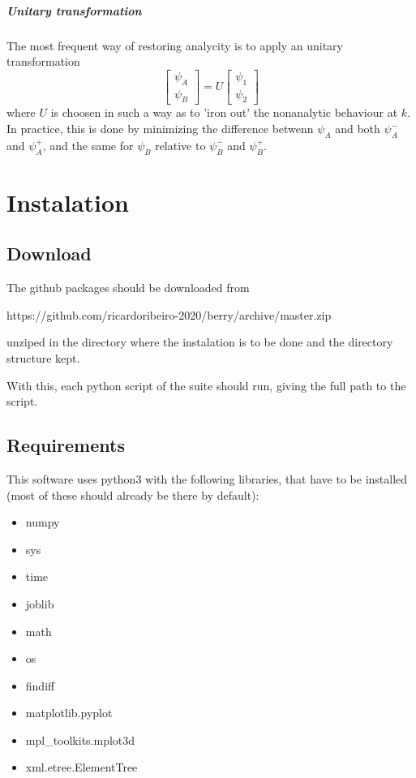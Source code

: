 \documentclass[a4paper,12pt]{report}
\begin{document}
\paragraph*{Unitary transformation}
The most frequent way of restoring analycity is to apply an unitary transformation
\begin{equation}
 \left[ \begin{matrix}
  \psi_A\\\psi_B
 \end{matrix}\right] = U
 \left[ \begin{matrix}
  \psi_1\\\psi_2
 \end{matrix}\right]
\end{equation}
where $U$ is choosen in such a way as to 'iron out' the nonanalytic behaviour at $k$.
In practice, this is done by minimizing the difference betwenn $\psi_A$ and both $\psi_A^-$ and $\psi_A^+$,
and the same for $\psi_B$ relative to $\psi_B^-$ and $\psi_B^+$.




\chapter{Instalation}

\section{Download}
The github packages should be downloaded from\medskip

 https://github.com/ricardoribeiro-2020/berry/archive/master.zip\medskip

unziped in the directory where the instalation is to be done and the directory structure kept.

With this, each python script of the suite should run, giving the full path to the script.

\section{Requirements}

This software uses python3 with the following libraries, that have to be installed
(most of these should already be there by default):
\begin{itemize}
 \item numpy
 \item sys
 \item time
 \item joblib
 \item math
 \item os
 \item findiff
 \item matplotlib.pyplot
 \item mpl\_toolkits.mplot3d
 \item xml.etree.ElementTree
\end{itemize}
\end{document}
